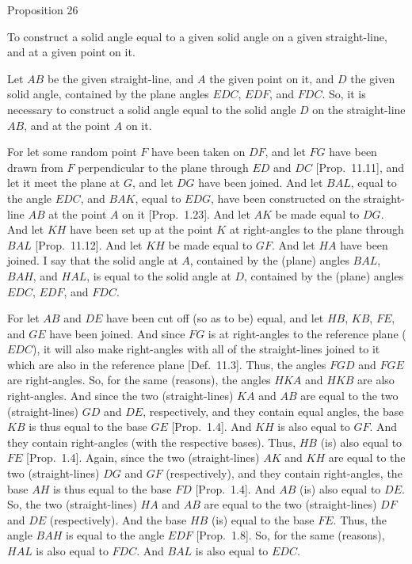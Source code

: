 
\begin{center}
{\large Proposition 26}
\end{center}

To construct a solid angle equal to a given solid
angle on a given straight-line, and at a given point on it.

Let $AB$ be the given straight-line, and $A$ the given point on it, and
$D$ the given solid angle, contained by the plane angles $EDC$, $EDF$, and
$FDC$. So, it is necessary to construct a solid angle equal to the solid angle $D$ on the straight-line $AB$, and at the point $A$ on it.\\

\epsfysize=1.8in
\centerline{}

For let some random point $F$ have been taken on $DF$, and let
$FG$ have been drawn from $F$ perpendicular to the plane through $ED$ and
$DC$  [Prop.~11.11],  and let it meet the plane at $G$, and let $DG$ have been joined.
And let $BAL$, equal to the angle $EDC$,  and $BAK$, equal to $EDG$, have been constructed 
on the straight-line $AB$ at the point $A$ on it [Prop.~1.23]. And let $AK$ be made equal to $DG$.  And let $KH$
have been set up at the point $K$ at right-angles to the plane through $BAL$
[Prop.~11.12]. And let $KH$ be made equal to
$GF$. And let $HA$ have been joined. I say that the solid angle at $A$,
contained by the (plane) angles $BAL$, $BAH$, and $HAL$, is equal
to the solid angle at $D$, contained by the (plane) angles $EDC$,
$EDF$, and $FDC$.

For let $AB$ and $DE$ have been cut off (so as to be) equal, and let
$HB$, $KB$, $FE$, and $GE$ have been joined. And since $FG$
is at right-angles to the reference plane ($EDC$), it will also   make right-angles
with all of the straight-lines joined to it which are also in the reference
plane [Def.~11.3]. Thus, the angles $FGD$ and
$FGE$ are right-angles.  So, for the same (reasons), the angles $HKA$
and $HKB$ are also right-angles. And since the two (straight-lines)
$KA$ and $AB$ are equal to the two (straight-lines) $GD$ and $DE$,
respectively, and they contain equal angles, the base $KB$ is thus equal
to the base $GE$ [Prop.~1.4]. And $KH$ is also equal to $GF$. And they contain right-angles (with the respective bases). 
Thus, $HB$ (is) also equal to $FE$ [Prop.~1.4]. 
Again, since the two (straight-lines) $AK$ and $KH$ are equal to
the two (straight-lines) $DG$ and $GF$ (respectively), and they contain
right-angles, the base $AH$ is thus equal to the base $FD$ [Prop.~1.4].  And $AB$ (is) also equal to $DE$. So, the
two (straight-lines) $HA$ and $AB$ are equal to the two (straight-lines)
$DF$ and $DE$ (respectively).  And the base $HB$ (is) equal to the
base $FE$. Thus, the angle $BAH$ is equal to the angle $EDF$
[Prop.~1.8]. So, for the same (reasons),  $HAL$
is also equal to $FDC$. And $BAL$ is also equal to $EDC$.

